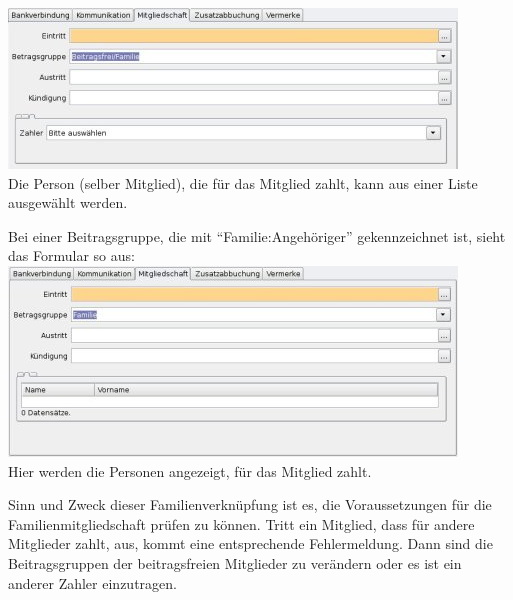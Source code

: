 \documentclass[a4paper,BCOR30mm,DIV14,pdftex,liststotoc,footsepline,openany]{scrbook}
\begin{document}
\includegraphics{./screenshots/mitgliedmitgliedschaftzahler.jpg}\\
Die Person (selber Mitglied), die für das Mitglied zahlt, kann aus einer Liste ausgewählt werden. 

Bei einer Beitragsgruppe, die mit ``Familie:Angehöriger'' gekennzeichnet ist, sieht das Formular so aus:\\
\includegraphics{./screenshots/mitgliedmitgliedschaftfamilienangehoerige.jpg}\\
Hier werden die Personen angezeigt, für das Mitglied zahlt.

Sinn und Zweck dieser Familienverknüpfung ist es, die Voraussetzungen für die Familienmitgliedschaft prüfen zu können.
Tritt ein Mitglied, dass für andere Mitglieder zahlt, aus, kommt eine entsprechende Fehlermeldung. Dann sind die Beitragsgruppen der beitragsfreien Mitglieder zu verändern oder es ist ein anderer Zahler einzutragen.
\end{document}
